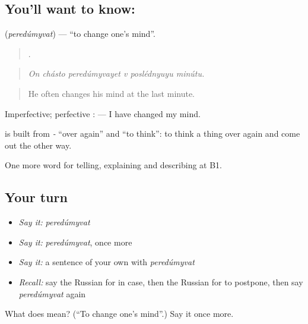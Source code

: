 \subsection*{You'll want to know: }
\textbf{} (\emph{peredúmyvat}) — \textquotedblleft{}to change one’s mind\textquotedblright{}.

\begin{quote}
     .
\end{quote}

\begin{quote}
\emph{On chásto peredúmyvayet v poslédnyuyu minútu.}
\end{quote}

\begin{quote}
He often changes his mind at the last minute.
\end{quote}

Imperfective; perfective \emph{}: \emph{ } — I have changed my mind.

\begin{cousinweb}
\textbf{} is built from \emph{-} \textquotedblleft{}over again\textquotedblright{} and \emph{} \textquotedblleft{}to think\textquotedblright{}: to think a thing over again and come out the other way.
\end{cousinweb}

\begin{grammarlens}[title={What you've built}]
One more word for telling, explaining and describing at B1.
\end{grammarlens}

\subsection*{Your turn}
\begin{itemize}
\raggedright
  \item \emph{Say it:} \emph{peredúmyvat}
  \item \emph{Say it:} \emph{peredúmyvat}, once more
  \item \emph{Say it:} a sentence of your own with \emph{peredúmyvat}
  \item \emph{Recall:} say the Russian for in case, then the Russian for to postpone, then say \emph{peredúmyvat} again
\end{itemize}

\begin{tcolorbox}[breakable,colback=teal!4,colframe=teal!35!black,title={Before you move on}]
What does  mean? (\textquotedblleft{}To change one’s mind\textquotedblright{}.) Say it once more.
\end{tcolorbox}
